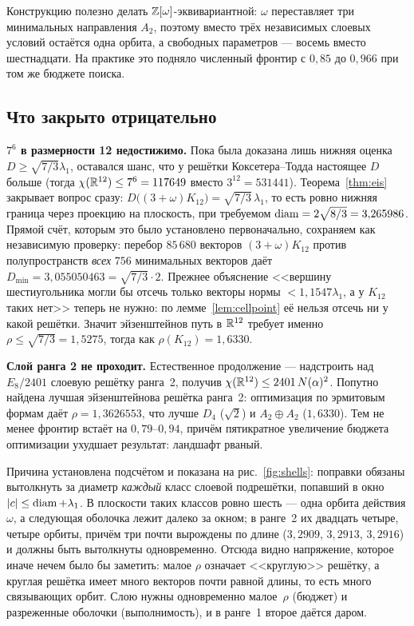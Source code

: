 Конструкцию полезно делать $\mathbb{Z}[\omega]$-эквивариантной: $\omega$ переставляет три
минимальных направления $A_2$, поэтому вместо трёх независимых слоевых условий
остаётся одна орбита, а свободных параметров --- восемь вместо шестнадцати. На
практике это подняло численный фронтир с $0{,}85$ до $0{,}966$ при том же
бюджете поиска.

\subsection{Что закрыто отрицательно}
\label{ssec:prodneg}

\textbf{$7^6$ в размерности 12 недостижимо.} Пока была доказана лишь нижняя
оценка $D\ge\sqrt{7/3}\lambda_1$, оставался шанс, что у решётки
Коксетера--Тодда настоящее $D$ больше (тогда $\chi(\mathbb{R}^{12})\le7^6=117649$ вместо
$3^{12}=531441$). Теорема~\ref{thm:eis} закрывает вопрос сразу:
$D\bigl((3+\omega)K_{12}\bigr)=\sqrt{7/3}\,\lambda_1$, то есть ровно нижняя граница через проекцию на
плоскость, при требуемом $\operatorname{diam}=2\sqrt{8/3}=3{,}265986$. Прямой счёт, которым это было
установлено первоначально, сохраняем как независимую проверку: перебор
$85\,680$ векторов $(3+\omega)K_{12}$ против полупространств \emph{всех} $756$
минимальных векторов даёт $D_{\min}=3{,}055050463=\sqrt{7/3}\cdot2$. Прежнее
объяснение <<вершину шестиугольника могли бы отсечь только векторы нормы
$<1{,}1547\lambda_1$, а у $K_{12}$ таких нет>> теперь не нужно: по
лемме~\ref{lem:cellpoint} её нельзя отсечь ни у какой решётки. Значит
эйзенштейнов путь в $\mathbb{R}^{12}$ требует именно $\rho\le\sqrt{7/3}=1{,}5275$, тогда
как $\rho(K_{12})=1{,}6330$.

\textbf{Слой ранга 2 не проходит.} Естественное продолжение --- надстроить над
$E_8/2401$ слоевую решётку ранга~2, получив $\chi(\mathbb{R}^{12})\le2401\,N(\alpha)^2$.
Попутно найдена лучшая эйзенштейнова решётка ранга~2: оптимизация по эрмитовым
формам даёт $\rho=1{,}3626553$, что лучше $D_4$ ($\sqrt2$) и $A_2\oplus A_2$
($1{,}6330$). Тем не менее фронтир встаёт на $0{,}79$--$0{,}94$, причём
пятикратное увеличение бюджета оптимизации ухудшает результат: ландшафт рваный.

Причина установлена подсчётом и показана на рис.~\ref{fig:shells}: поправки
обязаны вытолкнуть за диаметр \emph{каждый} класс слоевой подрешётки, попавший
в окно $|c|\le\operatorname{diam}+\lambda_1$. В плоскости таких классов ровно шесть --- одна
орбита действия $\omega$, а следующая оболочка лежит далеко за окном; в ранге~2
их двадцать четыре, четыре орбиты, причём три почти вырождены по длине
($3{,}2909$, $3{,}2913$, $3{,}2916$) и должны быть вытолкнуты одновременно.
Отсюда видно напряжение, которое иначе нечем было бы заметить: малое $\rho$ означает
<<круглую>> решётку, а круглая решётка имеет много векторов почти равной длины,
то есть много связывающих орбит. Слою нужны одновременно малое~$\rho$ (бюджет)
и разреженные оболочки (выполнимость), и в ранге~1 второе даётся даром.

